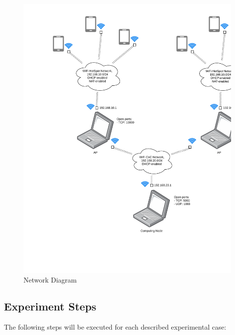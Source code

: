 \begin{figure}[H]
	\centering
	\includegraphics[width=0.3\linewidth, keepaspectratio]{images/Deployment Diagram-Network_Diagram.pdf}
\caption{Network Diagram}
\label{fig:network-diagram}
\end{figure}

\hypertarget{experiment-steps}{%
\subsection{Experiment Steps}\label{experiment-steps}}

The following steps will be executed for each described experimental
case:

